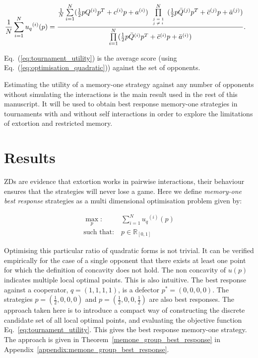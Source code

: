 \documentclass[10pt]{article}
\newcommand{\R}{\mathbb{R}}
\begin{document}
\begin{align}\label{eq:tournament_utility}
       & \frac{1}{N} \sum\limits_{i=1} ^ {N} {u_q}^{(i)} (p) =
       \frac{\frac{1}{N} \sum\limits_{i=1} ^ {N} (\frac{1}{2} pQ^{(i)} p^T + c^{(i)} p + a^ {(i)})
       \prod\limits_{\tiny\begin{array}{l} j=1 \\ j \neq i \end{array}} ^
       N (\frac{1}{2} p\bar{Q}^{(j)} p^T + \bar{c}^{(j)} p + \bar{a}^ {(j)})}
       {\prod\limits_{i=1} ^ N (\frac{1}{2} p\bar{Q}^{(i)} p^T + \bar{c}^{(i)} p + \bar{a}^ {(i)})}.
\end{align}

Eq.~(\ref{eq:tournament_utility}) is the average score (using Eq.~(\ref{eq:optimisation_quadratic})) against the set of opponents.

Estimating the utility of a memory-one strategy against any number of opponents
without simulating the interactions is the main result used in the rest of this manuscript.
It will be used to obtain best response memory-one strategies in tournaments
with and without self interactions in order to explore the limitations of extortion
and restricted memory.

\section{Results}\label{section:results}

ZDs are evidence that extortion works
in pairwise interactions, their behaviour ensures that the strategies will never
lose a game.
Here we define \textit{memory-one best response}
strategies as a multi dimensional optimisation problem given by:

\begin{equation}\label{eq:mo_tournament_optimisation}
    \begin{aligned}
    \max_p: & \ \sum_{i=1} ^ {N} {u_q}^{(i)} (p)
    \\
    \text{such that}: & \ p \in \R_{[0, 1]}
    \end{aligned}
\end{equation}

Optimising this particular ratio of quadratic forms is not trivial. It can be
verified empirically for the case of a single opponent that there exists at
least one point for which the definition of concavity does not hold.
The non concavity of \(u(p)\) indicates multiple local
optimal points. This is also intuitive. The best response against a cooperator,
\(q=(1, 1, 1, 1)\), is a defector \(p^*=(0, 0, 0, 0)\). The strategies
\(p=(\frac{1}{2}, 0, 0, 0)\) and \(p=(\frac{1}{2}, 0, 0, \frac{1}{2})\) are also
best responses. The approach taken here is to introduce a compact way of
constructing the discrete candidate set of all local optimal points, and evaluating
the objective function Eq.~\ref{eq:tournament_utility}. This gives the best
response memory-one strategy. The approach is given in
Theorem~\ref{memone_group_best_response} in Appendix~\ref{appendix:memone_group_best_response}.
\end{document}
